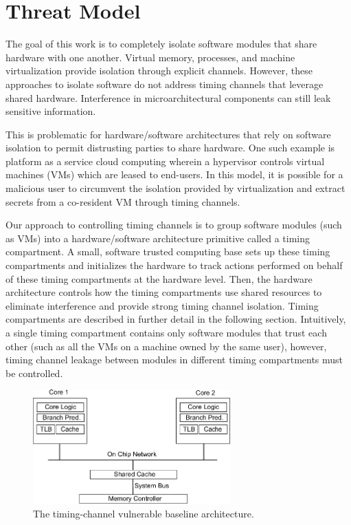 \section{ Threat Model }

    The goal of this work is to completely isolate software modules that share
    hardware with one another. Virtual memory, processes, and machine 
    virtualization provide isolation through explicit channels. However, these 
    approaches to isolate software do not address timing channels that leverage 
    shared hardware. Interference in microarchitectural components can still 
    leak sensitive information.
    
    This is problematic for hardware/software architectures that rely on 
    software isolation to permit distrusting parties to share hardware. One 
    such example is platform as a service cloud computing wherein a hypervisor 
    controls virtual machines (VMs)
    which are leased to end-users. In this model, it is possible for a 
    malicious user to circumvent the isolation provided by virtualization and 
    extract secrets from a co-resident VM  through timing channels.

    Our approach to controlling timing channels is to group software modules 
    (such as VMs) into a hardware/software architecture primitive called a 
    timing compartment. A small, software trusted computing
    base sets up these timing compartments and initializes the hardware to 
    track actions performed on behalf of these timing compartments at the 
    hardware level. Then, the hardware architecture controls how the timing 
    compartments use shared resources to eliminate interference and provide 
    strong timing channel isolation. Timing compartments are described in 
    further detail in the following section. Intuitively, a single timing 
    compartment contains only software modules that trust each other (such as 
    all the VMs on a machine owned by the same user), however, timing channel 
    leakage between modules in different timing compartments must be 
    controlled.

    \begin{figure}
        \begin{center}
            \includegraphics[width=3in]{figs/baseline.eps}
            \caption{The timing-channel vulnerable baseline architecture.}
            \label{fig:baseline}
        \end{center}
    \end{figure}

